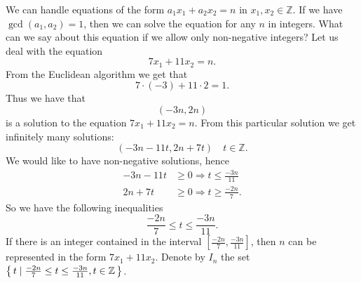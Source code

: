 We can handle equations of the form $a_1x_1+a_2x_2=n$ in $x_1,x_2\in\mathbb{Z}$. If we have $\gcd(a_1,a_2)=1$,
then we can solve the equation for any $n$ in integers. What can we say about this equation if we allow only
non-negative integers? Let us deal with the equation $$7x_1+11x_2=n.$$ From the Euclidean algorithm we get that
$$
7\cdot(-3)+11\cdot 2=1.
$$
Thus we have that
$$
(-3n,2n)
$$
is a solution to the equation $7x_1+11x_2=n$. From this particular solution we get infinitely many solutions:
$$
(-3n-11t,2n+7t)\quad t\in\mathbb{Z}.
$$
We would like to have non-negative solutions, hence
\begin{align*}
-3n-11t&\geq 0\Rightarrow t\leq \frac{-3n}{11}\\
2n+7t&\geq 0\Rightarrow t\geq \frac{-2n}{7}.
\end{align*}
So we have the following inequalities
$$
\frac{-2n}{7}\leq t\leq \frac{-3n}{11}.
$$
If there is an integer contained in the interval $[\frac{-2n}{7},\frac{-3n}{11}]$, then $n$ can be represented
in the form $7x_1+11x_2$. Denote by $I_n$ the set $\left\{\,t\mid  \frac{-2n}{7}\leq t\leq \frac{-3n}{11}, t\in\mathbb{Z}\,\right\}$.
